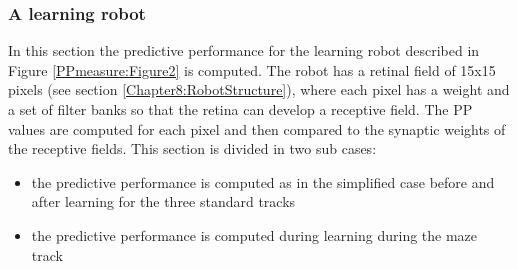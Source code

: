 \subsubsection{A learning robot}
In this section the predictive performance for the learning robot described in 
Figure \ref{PPmeasure:Figure2} is computed. 
The robot has a retinal field of 15x15 pixels (see section \ref{Chapter8:RobotStructure}), 
where each pixel has a weight and a set of filter banks so that the retina 
can develop a receptive field.
The PP values are computed for each pixel and then compared to the synaptic weights
of the receptive fields.
This section is divided in two sub cases:
\begin{itemize}
 \item the predictive performance is computed as in the simplified case before and after learning for the three standard tracks
 \item the predictive performance is computed during learning during the maze track
\end{itemize}

